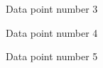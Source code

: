 \documentclass{article}
\begin{document}
\begin{figure}
\centering
{}
\caption{Data point number 3} \label{fig:q1631}
\end{figure}

\begin{figure}
\centering
{}
\caption{Data point number 4} \label{fig:q1641}
\end{figure}

\begin{figure}
\centering
{}
\caption{Data point number 5} \label{fig:q1651}
\end{figure}
\end{document}
